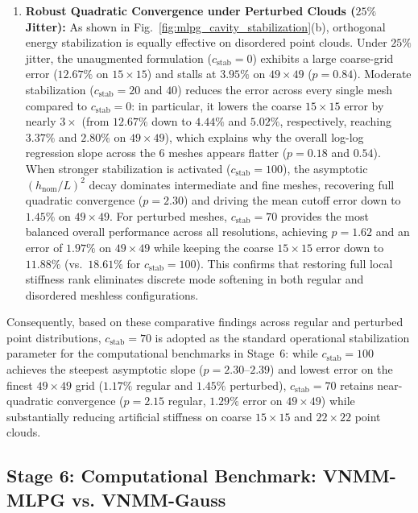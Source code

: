 \documentclass[VANCOUVER,Times1COL]{WileyNJD-v5}
\begin{document}
\begin{enumerate}
    \item \textbf{Robust Quadratic Convergence under Perturbed Clouds ($25\%$ Jitter):} As shown in Fig.~\ref{fig:mlpg_cavity_stabilization}(b), orthogonal energy stabilization is equally effective on disordered point clouds. Under $25\%$ jitter, the unaugmented formulation ($c_{\mathrm{stab}} = 0$) exhibits a large coarse-grid error ($12.67\%$ on $15\times 15$) and stalls at $3.95\%$ on $49 \times 49$ ($p = 0.84$). Moderate stabilization ($c_{\mathrm{stab}} = 20$ and $40$) reduces the error across every single mesh compared to $c_{\mathrm{stab}} = 0$: in particular, it lowers the coarse $15\times 15$ error by nearly $3\times$ (from $12.67\%$ down to $4.44\%$ and $5.02\%$, respectively, reaching $3.37\%$ and $2.80\%$ on $49\times 49$), which explains why the overall log-log regression slope across the 6 meshes appears flatter ($p = 0.18$ and $0.54$). When stronger stabilization is activated ($c_{\mathrm{stab}} = 100$), the asymptotic $(h_{\mathrm{nom}}/L)^2$ decay dominates intermediate and fine meshes, recovering full quadratic convergence ($p = 2.30$) and driving the mean cutoff error down to $\mathbf{1.45\%}$ on $49 \times 49$. For perturbed meshes, $c_{\mathrm{stab}} = 70$ provides the most balanced overall performance across all resolutions, achieving $p = 1.62$ and an error of $1.97\%$ on $49 \times 49$ while keeping the coarse $15 \times 15$ error down to $11.88\%$ (vs.\ $18.61\%$ for $c_{\mathrm{stab}} = 100$). This confirms that restoring full local stiffness rank eliminates discrete mode softening in both regular and disordered meshless configurations.
\end{enumerate}

Consequently, based on these comparative findings across regular and perturbed point distributions, $c_{\mathrm{stab}} = 70$ is adopted as the standard operational stabilization parameter for the computational benchmarks in Stage~6: while $c_{\mathrm{stab}} = 100$ achieves the steepest asymptotic slope ($p = 2.30\text{--}2.39$) and lowest error on the finest $49\times 49$ grid ($1.17\%$ regular and $1.45\%$ perturbed), $c_{\mathrm{stab}} = 70$ retains near-quadratic convergence ($p = 2.15$ regular, $1.29\%$ error on $49\times 49$) while substantially reducing artificial stiffness on coarse $15\times 15$ and $22\times 22$ point clouds.

\subsection{Stage 6: Computational Benchmark: VNMM-MLPG vs. VNMM-Gauss}
\label{subsec:stage6_benchmark}
\end{document}
